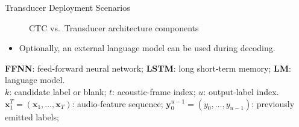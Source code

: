 \documentclass[xcolor=table,mathserif,9pt,usepdftitle=false]{beamer}    %
\begin{document}
\begin{frame}{Transducer Deployment Scenarios}
\begin{figure}
{%
    }
    \vspace{-2pt}
    \caption{CTC vs.\ Transducer architecture components}
  \end{figure}
  \begin{itemize}
    \item Optionally, an external language model can be used during decoding.
  \end{itemize}
  {\scriptsize \textbf{FFNN}: feed-forward neural network; \textbf{LSTM}: long short-term memory; \textbf{LM}: language model.} \\
  {\scriptsize $k$: candidate label or blank; $t$: acoustic-frame index; $u$: output-label index.}\\
  {\scriptsize $\mathbf{x}_1^T=(\mathbf{x}_1,\ldots,\mathbf{x}_T)$: audio-feature sequence;
  $\mathbf{y}_0^{u-1}=(y_0,\ldots,y_{u-1})$: previously emitted labels;}
\end{frame}
\end{document}
